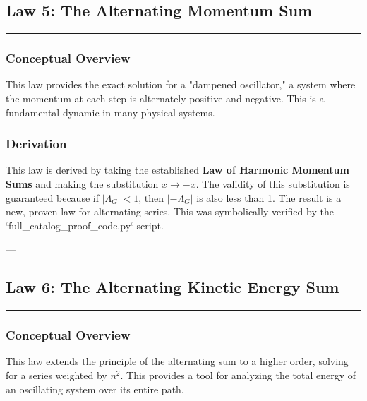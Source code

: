 \subsection*{Law 5: The Alternating Momentum Sum}
\hrule
\vspace{0.3cm}
\vspace{0.5cm}

\subsubsection*{Conceptual Overview}
This law provides the exact solution for a "dampened oscillator," a system where the momentum at each step is alternately positive and negative. This is a fundamental dynamic in many physical systems.

\subsubsection*{Derivation}
This law is derived by taking the established \textbf{Law of Harmonic Momentum Sums} and making the substitution $x \to -x$. The validity of this substitution is guaranteed because if $|\Lambda_G|<1$, then $|-\Lambda_G|$ is also less than 1. The result is a new, proven law for alternating series. This was symbolically verified by the `full\_catalog\_proof\_code.py` script.

---
\vspace{1cm}

\subsection*{Law 6: The Alternating Kinetic Energy Sum}
\hrule
\vspace{0.3cm}
\vspace{0.5cm}

\subsubsection*{Conceptual Overview}
This law extends the principle of the alternating sum to a higher order, solving for a series weighted by $n^2$. This provides a tool for analyzing the total energy of an oscillating system over its entire path.

